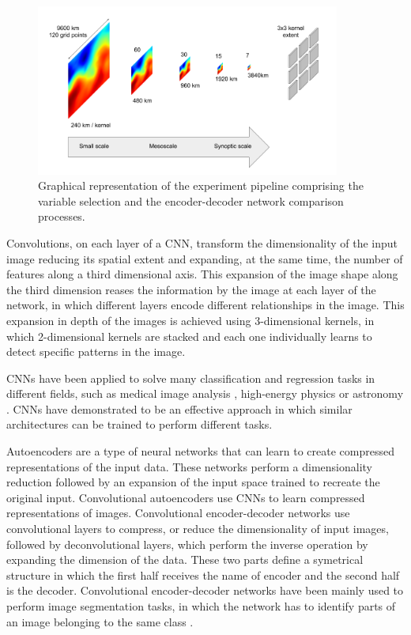 \documentclass[twocol]{ametsoc}
\begin{document}
\begin{figure}[h]
 \centerline{\includegraphics[width=10cm]{cnn_scales.png}}
  \caption{Graphical representation of the experiment pipeline comprising the variable selection and the encoder-decoder network comparison processes.}\label{cnn_scales}
\end{figure}

Convolutions, on each layer of a CNN, transform the dimensionality of the input image reducing its spatial extent and expanding, at the same time, the number of features along a third dimensional axis. This expansion of the image shape along the third dimension reases the information by the image at each layer of the network, in which different layers encode different relationships in the image. This expansion in depth of the images is achieved using 3-dimensional kernels, in which 2-dimensional kernels are stacked and each one individually learns to detect specific patterns in the image.

CNNs have been applied to solve many classification and regression tasks in different fields, such as medical image analysis \citep{litjens2017survey}, high-energy physics \citep{baldi2014searching} or astronomy \citep{dieleman2015rotation}. CNNs have demonstrated to be an effective approach in which similar architectures can be trained to perform different tasks.

Autoencoders \citep{hinton2006reducing} are a type of neural networks that can learn to create compressed representations of the input data. These networks perform a dimensionality reduction followed by an expansion of the input space trained to recreate the original input. Convolutional autoencoders \citep{masci2011stacked} use CNNs to learn compressed representations of images. Convolutional encoder-decoder networks use convolutional layers to compress, or reduce the dimensionality of input images, followed by deconvolutional layers, which perform the inverse operation by expanding the dimension of the data. These two parts define a symetrical structure in which the first half receives the name of encoder and the second half is the decoder. Convolutional encoder-decoder networks have been mainly used to perform image segmentation tasks, in which the network has to identify parts of an image belonging to the same class \citep{long2015fully}.
\end{document}
